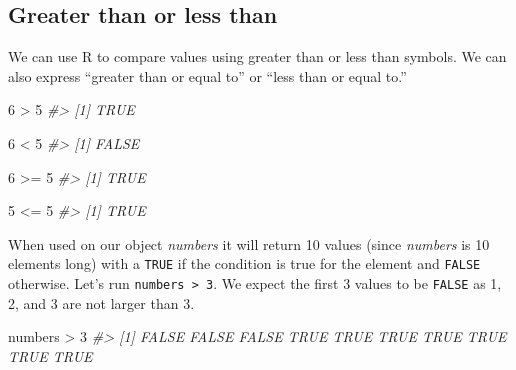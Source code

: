 \documentclass[
]{krantz}
\makeatletter
\newenvironment{Shaded}{\begin{snugshade}}{\end{snugshade}}
\newcommand{\CommentTok}[1]{\textcolor[rgb]{0.37,0.37,0.37}{\textit{#1}}}
\newcommand{\DecValTok}[1]{\textcolor[rgb]{0.06,0.06,0.06}{#1}}
\newcommand{\NormalTok}[1]{#1}
\newcommand{\SpecialCharTok}[1]{\textcolor[rgb]{0,0,0}{#1}}
\newenvironment{kframe}{%
\medskip{}
\setlength{\fboxsep}{.8em}
 \def\at@end@of@kframe{}%
 \ifinner\ifhmode%
  \def\at@end@of@kframe{\end{minipage}}%
  \begin{minipage}{\columnwidth}%
 \fi\fi%
 \def\FrameCommand##1{\hskip\@totalleftmargin \hskip-\fboxsep
 \colorbox{shadecolor}{##1}\hskip-\fboxsep
     \hskip-\linewidth \hskip-\@totalleftmargin \hskip\columnwidth}%
 \MakeFramed {\advance\hsize-\width
   \@totalleftmargin\z@ \linewidth\hsize
   \@setminipage}}%
 {\par\unskip\endMakeFramed%
 \at@end@of@kframe}
\renewenvironment{Shaded}{\begin{kframe}}{\end{kframe}}
\makeatother
\begin{document}
\hypertarget{greater-than-or-less-than}{%
\subsection{Greater than or less than}\label{greater-than-or-less-than}}

We can use R to compare values using greater than or less than symbols. We can also express ``greater than or equal to'' or ``less than or equal to.''

\begin{Shaded}
\begin{Highlighting}[]
\DecValTok{6} \SpecialCharTok{\textgreater{}} \DecValTok{5}
\CommentTok{\#\textgreater{} [1] TRUE}
\end{Highlighting}
\end{Shaded}

\begin{Shaded}
\begin{Highlighting}[]
\DecValTok{6} \SpecialCharTok{\textless{}} \DecValTok{5}
\CommentTok{\#\textgreater{} [1] FALSE}
\end{Highlighting}
\end{Shaded}

\begin{Shaded}
\begin{Highlighting}[]
\DecValTok{6} \SpecialCharTok{\textgreater{}=} \DecValTok{5}
\CommentTok{\#\textgreater{} [1] TRUE}
\end{Highlighting}
\end{Shaded}

\begin{Shaded}
\begin{Highlighting}[]
\DecValTok{5} \SpecialCharTok{\textless{}=} \DecValTok{5}
\CommentTok{\#\textgreater{} [1] TRUE}
\end{Highlighting}
\end{Shaded}

When used on our object \emph{numbers} it will return 10 values (since \emph{numbers} is 10 elements long) with a \texttt{TRUE} if the condition is true for the element and \texttt{FALSE} otherwise. Let's run \texttt{numbers\ \textgreater{}\ 3}. We expect the first 3 values to be \texttt{FALSE} as 1, 2, and 3 are not larger than 3.

\begin{Shaded}
\begin{Highlighting}[]
\NormalTok{numbers }\SpecialCharTok{\textgreater{}} \DecValTok{3}
\CommentTok{\#\textgreater{}  [1] FALSE FALSE FALSE  TRUE  TRUE  TRUE  TRUE  TRUE  TRUE  TRUE}
\end{Highlighting}
\end{Shaded}
\end{document}
